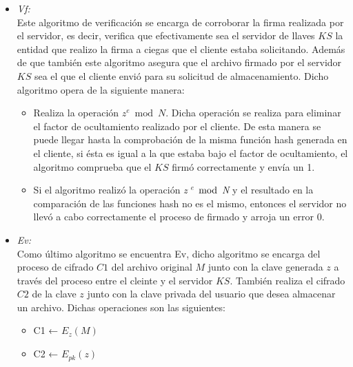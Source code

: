 \begin{itemize}
\item \textit{Vf: }\\

Este algoritmo de verificación se encarga de corroborar la firma realizada por el servidor, es decir, verifica que efectivamente sea el servidor de llaves $KS$ la entidad que realizo la firma a ciegas que el cliente estaba solicitando. Además de que también este algoritmo asegura que el archivo firmado por el servidor $KS$ sea el que el cliente envió para su solicitud de almacenamiento. 
Dicho algoritmo opera de la siguiente manera: 
   \begin{itemize}
	\item Realiza la operación $z^e \bmod N $. Dicha operación se realiza para eliminar el factor de ocultamiento realizado por el cliente. De esta manera se puede llegar hasta la comprobación de la misma función hash generada en el cliente, si ésta es igual a la que estaba bajo el factor de ocultamiento, el algoritmo comprueba que el $KS$ firmó correctamente y envía un 1.     
      
          \item Si el algoritmo realizó la operación \textit{z $^e$ $\bmod$ N} y el resultado en la comparación de las funciones hash no es el mismo, entonces el servidor no llevó a cabo correctamente el proceso de firmado y arroja un error 0. 

	\end{itemize}

\item \textit{Ev: }\\
          Como último algoritmo se encuentra Ev, dicho algoritmo se encarga del proceso de cifrado $C1$ del archivo original $M$ junto con la clave generada $z$ a través del proceso entre el cleinte y el servidor $KS$. También realiza el cifrado $C2$ de la clave $z$ junto con la clave privada del usuario que desea almacenar un archivo. Dichas operaciones son las siguientes:  

	\begin{itemize}
		\item C1 ← $E_{z}(M)$
		\item C2 ← $E_{pk}(z)$
	\end{itemize}


\end{itemize}





